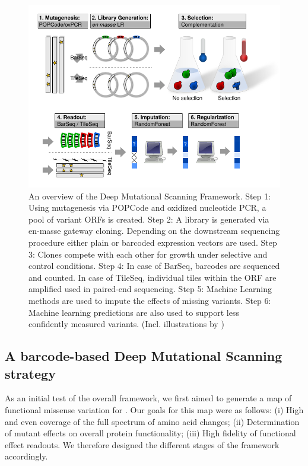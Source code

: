 \begin{figure}[h!]
	\centering
	\includegraphics[width=\textwidth]{img/framework_flowchart.pdf}
	\caption{An overview of the Deep Mutational Scanning Framework. Step 1: Using mutagenesis via POPCode and oxidized nucleotide PCR, a pool of variant ORFs is created. Step 2: A library is generated via en-masse gateway cloning. Depending on the downstream sequencing procedure either plain or barcoded expression vectors are used. Step 3: Clones compete with each other for growth under selective and control conditions. Step 4: In case of BarSeq, barcodes are sequenced and counted. In case of TileSeq, individual tiles within the ORF are amplified used in paired-end sequencing. Step 5: Machine Learning methods are used to impute the effects of missing variants. Step 6: Machine learning predictions are also used to support less confidently measured variants. (Incl. illustrations by \cite{kossin_thermometer_2004,bons_computer_2005})}
	\label{fig:framework}
\end{figure}


\subsection{A barcode-based Deep Mutational Scanning strategy}


As an initial test of the overall framework, we first aimed to generate a map of functional missense variation for . Our goals for this map were as follows: (i) High and even coverage of the full spectrum of amino acid changes; (ii) Determination of mutant effects on overall protein functionality; (iii) High fidelity of functional effect readouts. We therefore designed the different stages of the framework accordingly. 

